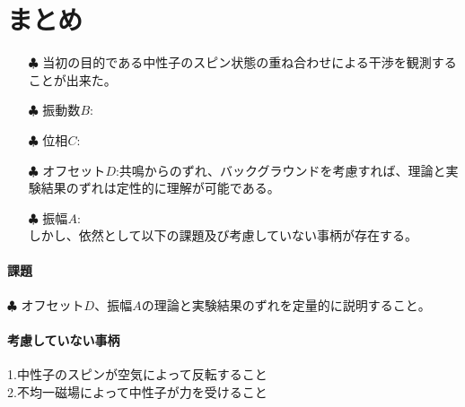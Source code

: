
\section{まとめ}
\begin{itemize}
\item[$\clubsuit$]当初の目的である中性子のスピン状態の重ね合わせによる干渉を観測することが出来た。\\
\item[$\clubsuit$]振動数$B$:\\
\item[$\clubsuit$]位相$C$:\\
\item[$\clubsuit$]オフセット$D$:共鳴からのずれ、バックグラウンドを考慮すれば、理論と実験結果のずれは定性的に理解が可能である。\\
\item[$\clubsuit$]振幅$A$:\\
しかし、依然として以下の課題及び考慮していない事柄が存在する。
\end{itemize}
\paragraph{課題}
$\clubsuit$
オフセット$D$、振幅$A$の理論と実験結果のずれを定量的に説明すること。\\
\paragraph{考慮していない事柄}
\hspace{-9.5pt}1.中性子のスピンが空気によって反転すること\\
2.不均一磁場によって中性子が力を受けること\\

